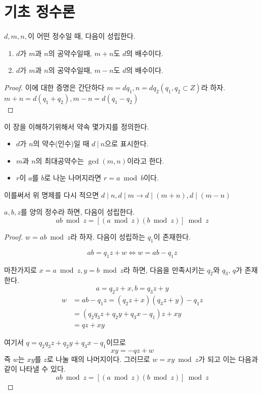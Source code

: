 \section{기초 정수론}

\begin{justbox}
    \begin{theorem}
        $d,m,n,$이 어떤 정수일 때, 다음이 성립한다.
        \begin{enumerate}
            \item $d$가 $m$과 $n$의 공약수일때, $m+n$도 $d$의 배수이다.
            \item $d$가 $m$과 $n$의 공약수일때, $m-n$도 $d$의 배수이다.     
        \end{enumerate}
    \end{theorem}
\end{justbox}
\begin{proof}
    이에 대한 증명은 간단하다
    $m=dq_1 , n = dq_2( q_1,q_2 \subset Z)$라 하자.
$m+n = d(q_1 + q_2) , m-n=d(q_1-q_2)$ \\
\end{proof}

이 장을 이해하기위해서 약속 몇가지를 정의한다.
\begin{itemize}
    \item $d$가 $n$의 약수(인수)일 때 $d\: |\: n$으로 표시한다.
    \item $m$과 $n$의 최대공약수는 $\gcd(m,n)$이라고 한다.
    \item $r$이 $a$를 $b$로 나눈 나머지라면  $r=a\bmod b$이다.
\end{itemize}
이를써서 위 명제를 다시 적으면 $d\mid n , d\mid m  \longrightarrow d \mid (m+n), d\mid (m-n)$        


\begin{justbox}
    \begin{theorem}
        $a,b,z$를 양의 정수라 하면, 다음이 성립한다.
        \[ ab\bmod z= [(a\bmod z)(b \bmod z)]\bmod z \]
    \end{theorem}
\end{justbox}

\begin{proof}

    $w = ab\bmod z$라 하자.
다음이 성립하는 $q_1$이 존재한다.

\[ab=q_1z+w \Longleftrightarrow w=ab-q_1 z \]

마찬가지로 $x =a \bmod z, y=b\bmod z$라 하면, 다음을 만족시키는 $q_2$와 $q_3$, $q$가 존재한다.
$$a=q_2 z + x , b=q_3 z + y$$
\begin{align*}
    w & = ab-q_1 z = (q_2z+x)(q_3z+y)-q_1z\\
    & =(q_2q_3z+q_2y+q_3x-q_1)z+xy\\
    & =qz+xy
\end{align*}
    

여기서 $q=q_2q_3z+q_2y+q_3x-q_1$이므로 
    \[xy=-qz+w\]
즉 $w$는 $xy$를 $z$로 나눌 때의 나머지이다. 그러므로 $w=xy \bmod z$가 되고 이는 다음과 같이 나타낼 수 있다.
     \[ab\bmod z= [(a\bmod z)(b \bmod z)]\bmod z\]    
\end{proof}


